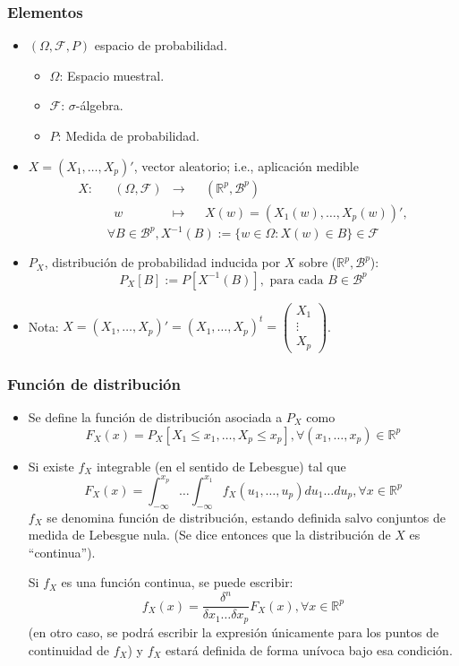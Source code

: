 \documentclass[11pt,a4paper]{article}
\begin{document}
\subsubsection{Elementos}
\begin{itemize}
\item $(\Omega, \mathcal{F}, P)$ espacio de probabilidad.
\begin{itemize}
\item $\Omega$: Espacio muestral.
\item $\mathcal{F}$: $\sigma$-álgebra.
\item $P$: Medida de probabilidad.
\end{itemize}

\item $X = (X_{1}, \dots, X_{p})'$, vector aleatorio; i.e., aplicación medible
$$\begin{aligned}
X: & & (\Omega, \mathcal{F}) & \to & & (\mathbb{R}^{p}, \mathcal{B}^{p}) \\
& & w & \mapsto & & X(w) = (X_{1}(w), \dots, X_{p}(w))',
\end{aligned}$$
$$\forall B \in \mathcal{B}^{p}, X^{-1}(B) := \{w \in \Omega: X(w) \in B\} \in \mathcal{F}$$

\item $P_{X}$, distribución de probabilidad inducida por $X$ sobre ($\mathbb{R}^{p}, \mathcal{B}^{p}$):
$$P_{X}[B] := P[X^{-1}(B)], \text{ para cada } B \in \mathcal{B}^{p}$$

\item Nota: $X = (X_{1}, \dots, X_{p})' = (X_{1}, \dots, X_{p})^{t} = \begin{pmatrix} X_{1} \\ \vdots \\ X_{p} \end{pmatrix}$.
\end{itemize}

\subsubsection{Función de distribución}
\begin{itemize}
\item Se define la función de distribución asociada a $P_{X}$ como
$$F_{X}(x) = P_{X}[X_{1} \leq x_{1}, \dots, X_{p} \leq x_{p}], \forall (x_{1}, \dots, x_{p}) \in \mathbb{R}^{p}$$

\item Si existe $f_{X}$ integrable (en el sentido de Lebesgue) tal que
$$F_{X}(x) = \int_{-\infty}^{x_{p}} \dots \int_{-\infty}^{x_{1}} f_{X}(u_{1}, \dots, u_{p}) du_{1} \dots du_{p}, \forall x \in \mathbb{R}^{p}$$
$f_{X}$ se denomina función de distribución, estando definida salvo conjuntos de medida de Lebesgue nula. (Se dice entonces que la distribución de $X$ es ``continua'').

Si $f_{X}$ es una función continua, se puede escribir:
$$f_{X}(x) = \frac{\delta^{n}}{\delta x_{1} \dots \delta x_{p}} F_{X}(x), \forall x \in \mathbb{R}^{p}$$
(en otro caso, se podrá escribir la expresión únicamente para los puntos de continuidad de $f_{X}$) y $f_{X}$ estará definida de forma unívoca bajo esa condición.
\end{itemize}
\end{document}
